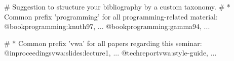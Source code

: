 # Suggestion to structure your bibliography by a custom taxonomy.
# * Common prefix 'programming' for all programming-related material:
@book{programming:knuth97, ...}
@book{programming:gamma94, ...}

# * Common prefix 'vwa' for all papers regarding this seminar:
@inproceedings{vwa:slides:lecture1, ...}
@techreport{vwa:style-guide, ...}
